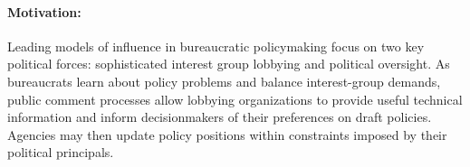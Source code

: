 


\paragraph{Motivation:} Leading models of influence in bureaucratic policymaking focus on two key political forces: sophisticated interest group lobbying and political oversight. 
As bureaucrats learn about policy problems and balance interest-group demands, public comment processes allow lobbying organizations to provide useful technical information and inform decisionmakers of their preferences on draft policies. 
Agencies may then update policy positions within constraints imposed by their political principals.

